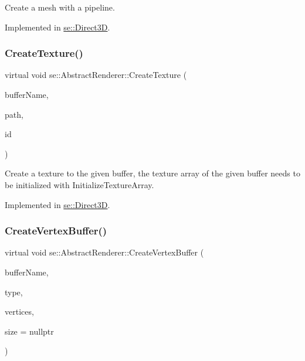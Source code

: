 Create a mesh with a pipeline. 

Implemented in \mbox{\hyperlink{classse_1_1_direct3_d_aab3d1a8b4ee8812dea07f5ecda5efc42}{se\+::\+Direct3D}}.

\mbox{\label{classse_1_1_abstract_renderer_a89f2efd2ee68cfb6735e51ce87206dfd}} 
\subsubsection{\texorpdfstring{Create\+Texture()}{CreateTexture()}}
{\footnotesize\ttfamily virtual void se\+::\+Abstract\+Renderer\+::\+Create\+Texture (\begin{DoxyParamCaption}\item[{const std\+::string \&}]{buffer\+Name,  }\item[{const std\+::string \&}]{path,  }\item[{int}]{id }\end{DoxyParamCaption})\hspace{0.3cm}{\ttfamily [pure virtual]}}

Create a texture to the given buffer, the texture array of the given buffer needs to be initialized with Initialize\+Texture\+Array. 

Implemented in \mbox{\hyperlink{classse_1_1_direct3_d_a33c350a77a959847d3571e14feb72c85}{se\+::\+Direct3D}}.

\mbox{\label{classse_1_1_abstract_renderer_a953d57d04771acae78c3725bee3639d4}} 
\subsubsection{\texorpdfstring{Create\+Vertex\+Buffer()}{CreateVertexBuffer()}}
{\footnotesize\ttfamily virtual void se\+::\+Abstract\+Renderer\+::\+Create\+Vertex\+Buffer (\begin{DoxyParamCaption}\item[{const std\+::string \&}]{buffer\+Name,  }\item[{\mbox{\hyperlink{namespacese_a9ed62241331cac830c5c1ba8450afc2b}{Render\+Type}}}]{type,  }\item[{\mbox{\hyperlink{structse_1_1_vertex}{Vertex}} $\ast$}]{vertices,  }\item[{\mbox{\hyperlink{namespacese_ada11715de7cf6e87b5dfb4611fe68d29}{Vector3i}} $\ast$}]{size = {\ttfamily nullptr} }\end{DoxyParamCaption})\hspace{0.3cm}{\ttfamily [pure virtual]}}

